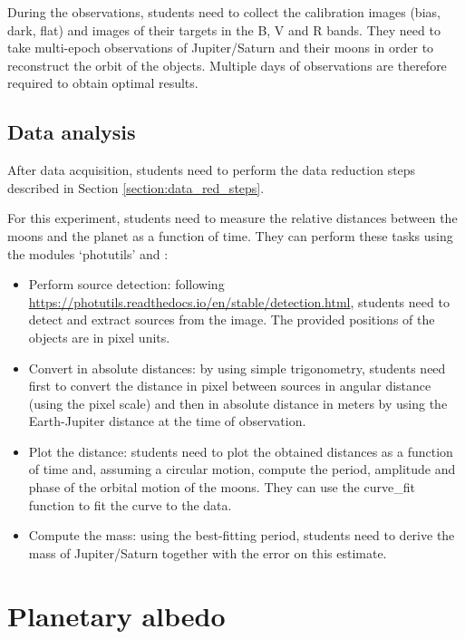 \documentclass[a4paper, 11pt, fleqn]{memoir}
\begin{document}
During the observations, students need to collect the calibration images (bias, dark, flat) and images of their targets in the B, V and R bands.
They need to take multi-epoch observations of Jupiter/Saturn and their moons in order to reconstruct the orbit of the objects.
Multiple days of observations are therefore required to obtain optimal results.

\subsection{Data analysis}

After data acquisition, students need to perform the data reduction steps described in Section \ref{section:data_red_steps}.

For this experiment, students need to measure the relative distances between the moons and the planet as a function of time.
They can perform these tasks using the  modules `photutils' and :
\begin{itemize}
    \item Perform source detection: following \url{https://photutils.readthedocs.io/en/stable/detection.html}, students need to detect and extract sources from the image.
          The provided positions of the objects are in pixel units.
    \item
          Convert in absolute distances: by using simple trigonometry, students need
          first to convert the distance in pixel between sources in angular distance
          (using the pixel scale) and then in absolute distance in meters by using the
          Earth-Jupiter distance at the time of observation.
    \item
          Plot the distance: students need to plot the obtained distances as a function
          of time and, assuming a circular motion, compute the period, amplitude and
          phase of the orbital motion of the moons.
          They can use the  curve\_fit function to fit the curve to the data.
    \item
          Compute the mass: using the best-fitting period, students need to derive the
          mass of Jupiter/Saturn together with the error on this estimate.
\end{itemize}

\section{Planetary albedo}
\end{document}
